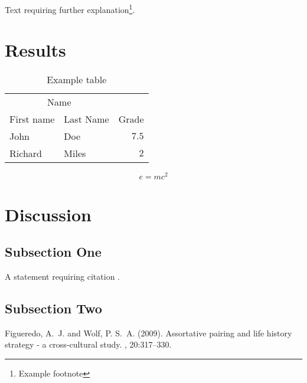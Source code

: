 \documentclass[twoside,twocolumn]{article}
\begin{document}
Text requiring further explanation\footnote{Example footnote}.


\section{Results}

\begin{table}
\caption{Example table}
\centering
\begin{tabular}{llr}
\toprule
\multicolumn{2}{c}{Name} \\
\cmidrule(r){1-2}
First name & Last Name & Grade \\
\midrule
John & Doe & $7.5$ \\
Richard & Miles & $2$ \\
\bottomrule
\end{tabular}
\end{table}

\blindtext %

\begin{equation}
\label{eq:emc}
e = mc^2
\end{equation}

\blindtext %


\section{Discussion}

\subsection{Subsection One}

A statement requiring citation \cite{Figueredo:2009dg}.
\blindtext %

\subsection{Subsection Two}

\blindtext %


\begin{thebibliography}{99} %

Figueredo, A.~J. and Wolf, P. S.~A. (2009).
\newblock Assortative pairing and life history strategy - a cross-cultural
  study.
, 20:317--330.
 
\end{thebibliography}

\end{document}
